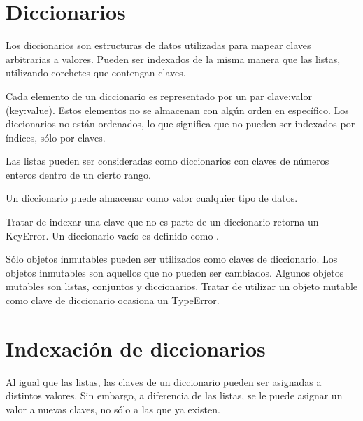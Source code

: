 \documentclass{report}
\begin{document}

\section{Diccionarios}


Los diccionarios son estructuras de datos utilizadas para mapear claves arbitrarias a valores. Pueden ser indexados de la misma manera que las listas, utilizando corchetes que contengan claves.


Cada elemento de un diccionario es representado por un par clave:valor (key:value). Estos elementos no se almacenan con algún orden en específico. Los diccionarios no están ordenados, lo que significa que no pueden ser indexados por índices, sólo por claves.

Las listas pueden ser consideradas como diccionarios con claves de números enteros dentro de un cierto rango.


Un diccionario puede almacenar como valor cualquier tipo de datos.


Tratar de indexar una clave que no es parte de un diccionario retorna un KeyError.
Un diccionario vacío es definido como {}.


Sólo objetos inmutables pueden ser utilizados como claves de diccionario. Los objetos inmutables son aquellos que no pueden ser cambiados. Algunos objetos mutables son listas, conjuntos y diccionarios. Tratar de utilizar un objeto mutable como clave de diccionario ocasiona un TypeError.

\section{Indexación de diccionarios}

Al igual que las listas, las claves de un diccionario pueden ser asignadas a distintos valores. Sin embargo, a diferencia de las listas, se le puede asignar un valor a nuevas claves, no sólo a las que ya existen.

\end{document}

